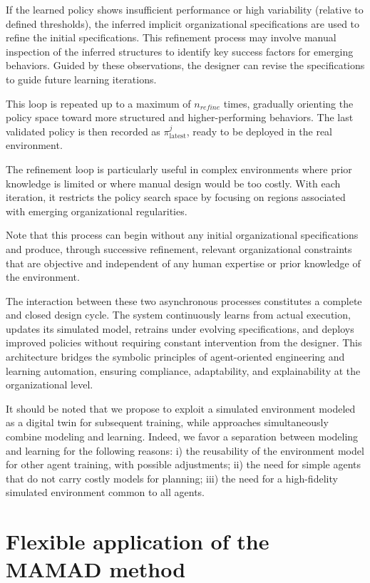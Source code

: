 If the learned policy shows insufficient performance or high variability (relative to defined thresholds), the inferred implicit organizational specifications are used to refine the initial specifications. This refinement process may involve manual inspection of the inferred structures to identify key success factors for emerging behaviors. Guided by these observations, the designer can revise the specifications to guide future learning iterations.

This loop is repeated up to a maximum of $n_{refine}$ times, gradually orienting the policy space toward more structured and higher-performing behaviors. The last validated policy is then recorded as $\pi^j_{\text {latest}}$, ready to be deployed in the real environment.

The refinement loop is particularly useful in complex environments where prior knowledge is limited or where manual design would be too costly. With each iteration, it restricts the policy search space by focusing on regions associated with emerging organizational regularities.

Note that this process can begin without any initial organizational specifications and produce, through successive refinement, relevant organizational constraints that are objective and independent of any human expertise or prior knowledge of the environment.

\noindent The interaction between these two asynchronous processes constitutes a complete and closed  design cycle. The system continuously learns from actual execution, updates its simulated model, retrains under evolving specifications, and deploys improved policies without requiring constant intervention from the designer. This architecture bridges the symbolic principles of agent-oriented engineering and learning automation, ensuring compliance, adaptability, and explainability at the organizational level.

\noindent It should be noted that we propose to exploit a simulated environment modeled as a digital twin for subsequent training, while  approaches simultaneously combine modeling and learning. Indeed, we favor a separation between modeling and learning for the following reasons: i) the reusability of the environment model for other agent training, with possible adjustments; \quad ii) the need for simple agents that do not carry costly models for planning; \quad iii) the need for a high-fidelity simulated environment common to all agents.

\section{Flexible application of the MAMAD method}
\label{subsec:mamad_flexible}

